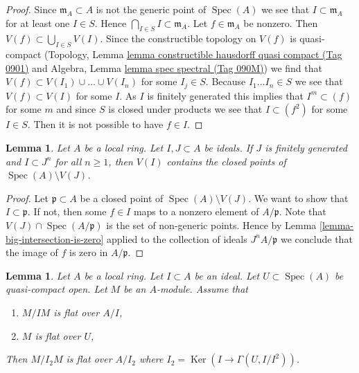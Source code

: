 \documentclass{amsart}
\theoremstyle{plain}
\newtheorem{lemma}[subsection]{Lemma}
\theoremstyle{definition}
\theoremstyle{remark}
\numberwithin{equation}{subsection}
\def\Spec{\mathop{\mathrm{Spec}}}
\def\Ker{\mathop{\mathrm{Ker}}}
\begin{document}
\begin{proof}
Since $\mathfrak m_A \subset A$ is not the generic point of $\Spec(A)$
we see that $I \subset \mathfrak m_A$ for at least one $I \in S$.
Hence $\bigcap_{I \in S} I \subset \mathfrak m_A$.
Let $f \in \mathfrak m_A$ be nonzero. Then
$V(f) \subset \bigcup_{I \in S} V(I)$.
Since the constructible topology on $V(f)$ is quasi-compact
(Topology, Lemma \href{https://stacks.math.columbia.edu/tag/0901}{lemma constructible hausdorff quasi compact (Tag 0901)}
and
Algebra, Lemma \href{https://stacks.math.columbia.edu/tag/090M}{lemma spec spectral (Tag 090M)})
we find that $V(f) \subset V(I_1) \cup \ldots \cup V(I_n)$
for some $I_j \in S$. Because $I_1 \ldots I_n \in S$ we see that
$V(f) \subset V(I)$ for some $I$. As $I$ is finitely generated
this implies that $I^m \subset (f)$ for some $m$ and since
$S$ is closed under products we see that $I \subset (f^2)$ for
some $I \in S$. Then it is not possible to have $f \in I$.
\end{proof}


\begin{lemma}
\label{lemma-closed-points-complement}
Let $A$ be a local ring. Let $I, J \subset A$ be ideals.
If $J$ is finitely generated and $I \subset J^n$ for all $n \geq 1$,
then $V(I)$ contains the closed points of $\Spec(A) \setminus V(J)$.
\end{lemma}

\begin{proof}
Let $\mathfrak p \subset A$ be a closed point of $\Spec(A) \setminus V(J)$.
We want to show that $I \subset \mathfrak p$. If not, then some $f \in I$
maps to a nonzero element of $A/\mathfrak p$. Note that
$V(J) \cap \Spec(A/\mathfrak p)$ is the set of non-generic points.
Hence by Lemma \ref{lemma-big-intersection-is-zero} applied
to the collection of ideals $J^nA/\mathfrak p$ we conclude that
the image of $f$ is zero in $A/\mathfrak p$.
\end{proof}


\begin{lemma}
\label{lemma-make-smaller-flatness-ideal}
Let $A$ be a local ring. Let $I \subset A$ be an ideal.
Let $U \subset \Spec(A)$ be quasi-compact open.
Let $M$ be an $A$-module. Assume that
\begin{enumerate}
\item $M/IM$ is flat over $A/I$,
\item $M$ is flat over $U$,
\end{enumerate}
Then $M/I_2M$ is flat over $A/I_2$ where
$I_2 = \Ker(I \to \Gamma(U, I/I^2))$.
\end{lemma}
\end{document}
